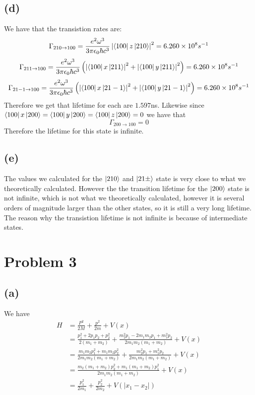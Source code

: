 \documentclass[11pt]{article}
\begin{document}
\subsection*{(d)}
We have that the transistion rates are:
$$\Gamma_{210\to 100} = \frac{e^2\omega^3}{3\pi\epsilon_0\hbar c^3}\left|\bra{100}z\ket{210}\right|^2 = 6.260\times 10^{8} s^{-1}$$
$$\Gamma_{211\to 100} = \frac{e^2\omega^3}{3\pi\epsilon_0\hbar c^3}\left(\left|\bra{100}x\ket{211}\right|^2+\left|\bra{100}y\ket{211}\right|^2\right)= 6.260\times 10^{8} s^{-1}$$
$$\Gamma_{21-1 \to 100} = \frac{e^2\omega^3}{3\pi\epsilon_0\hbar c^3}\left(\left|\bra{100}x\ket{21-1}\right|^2+\left|\bra{100}y\ket{21-1}\right|^2\right)= 6.260\times 10^{8} s^{-1}$$
Therefore we get that lifetime for each are $1.597$ns. 
Likewise since $\bra{100}x\ket{200} = \bra{100}y\ket{200} = \bra{100}z\ket{200} = 0$ we have that
$$\Gamma_{200\to 100} = 0$$
Therefore the lifetime for this state is infinite.
\subsection*{(e)}
The values we calculated for the $\ket{210}$ and $\ket{21\pm}$ state is very close to what we theoretically calculated. However the 
the transition lifetime for the $\ket{200}$ state is not infinite, which is not what we theoretically calculated, however it is several
orders of magnitude larger than the other states, so it is still a very long lifetime. The reason why the transistion lifetime is not infinite
is because of intermediate states. 
\section*{Problem 3}
\subsection*{(a)}
We have 
\begin{align*}
    H  &= \frac{P^2}{2M}+\frac{p^2}{2m}+V(x)\\
    &= \frac{p_1^2+2p_1p_2+p_2^2}{2(m_1+m_2)}+\frac{m_2^2p_1-2m_1m_2p_1+m_1^2p_2}{2m_1m_2(m_1+m_2)}+V(x)\\
    &= \frac{m_1m_2p_1^2+m_1m_2p_2^2}{2m_1m_2(m_1+m_2)}+\frac{m_2^2p_1+m_1^2p_2}{2m_1m_2(m_1+m_2)}+V(x)\\
    &= \frac{m_2(m_1+m_2)p_2^2+m_1(m_1+m_2)p_1^2}{2m_1m_2(m_1+m_2)}+V(x)\\
    &= \frac{p_1^2}{2m_1}+\frac{p_2^2}{2m_2}+V(|x_1-x_2|)
\end{align*}
\end{document}

